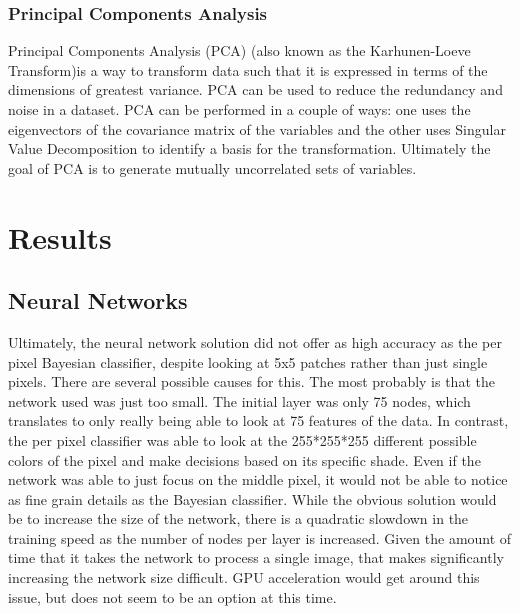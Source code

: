 \documentclass[12pt]{article}
\begin{document}
	\subsubsection{Principal Components Analysis}
	Principal Components Analysis (PCA) (also known as the Karhunen-Loeve Transform)is a way to transform data such that it is expressed in terms of the dimensions of greatest variance\cite{Shlens2003pca}. PCA can be used to reduce the redundancy and noise in a dataset. PCA can be performed in a couple of ways: one uses the eigenvectors of the covariance matrix of the variables and the other uses Singular Value Decomposition to identify a basis for the transformation. Ultimately the goal of PCA is to generate mutually uncorrelated sets of variables\cite{theodoridis2009pattern}.
	
	
\section{Results}
	\subsection{Neural Networks}
	Ultimately, the neural network solution did not offer as high accuracy as the per pixel Bayesian classifier, despite looking at 5x5 patches rather than just single pixels.  There are several possible causes for this.  The most probably is that the network used was just too small.  The initial layer was only 75 nodes, which translates to only really being able to look at 75 features of the data.  In contrast, the per pixel classifier was able to look at the 255*255*255 different possible colors of the pixel and make decisions based on its specific shade.  Even if the network was able to just focus on the middle pixel, it would not be able to notice as fine grain details as the Bayesian classifier.  While the obvious solution would be to increase the size of the network, there is a quadratic slowdown in the training speed as the number of nodes per layer is increased.  Given the amount of time that it takes the network to process a single image, that makes significantly increasing the network size difficult.  GPU acceleration would get around this issue, but does not seem to be an option at this time.
\end{document}
